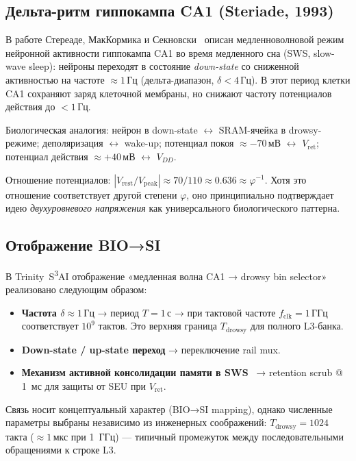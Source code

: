 \subsection{Дельта-ритм гиппокампа CA1 (Steriade, 1993)}

В работе Стереаде, МакКормика и Секновски~\cite{SteriadeCA1Slow1993}
описан медленноволновой режим нейронной активности гиппокампа CA1
во время медленного сна (SWS, slow-wave sleep):
нейроны переходят в состояние \emph{down-state} со сниженной активностью
на частоте $\approx 1\,\text{Гц}$ (дельта-диапазон, $\delta < 4\,\text{Гц}$).
В этот период клетки CA1 сохраняют заряд клеточной мембраны,
но снижают частоту потенциалов действия до $< 1\,\text{Гц}$.

Биологическая аналогия:
нейрон в down-state $\longleftrightarrow$ SRAM-ячейка в drowsy-режиме;
деполяризация $\longleftrightarrow$ wake-up;
потенциал покоя $\approx -70\,\text{мВ}$ $\longleftrightarrow$ $V_\mathrm{ret}$;
потенциал действия $\approx +40\,\text{мВ}$ $\longleftrightarrow$ $V_{DD}$.

Отношение потенциалов:
$|V_\mathrm{rest}/V_\mathrm{peak}| \approx 70/110 \approx 0.636 \approx \varphi^{-1}$.
Хотя это отношение соответствует другой степени $\varphi$,
оно принципиально подтверждает идею \emph{двухуровневого напряжения}
как универсального биологического паттерна.

\subsection{Отображение BIO→SI}

В Trinity~S\textsuperscript{3}AI отображение
«медленная волна CA1 → drowsy bin selector» реализовано следующим образом:
%
\begin{itemize}
  \item \textbf{Частота $\delta \approx 1\,\text{Гц}$}
        → период $T = 1\,\text{с}$
        → при тактовой частоте $f_\mathrm{clk} = 1\,\text{ГГц}$
        соответствует $10^9$ тактов.
        Это верхняя граница $T_\mathrm{drowsy}$ для полного L3-банка.
  \item \textbf{Down-state / up-state переход}
        → переключение rail mux.
  \item \textbf{Механизм активной консолидации памяти в SWS}~\cite{SteriadeCA1Slow1993}
        → retention scrub @ 1~мс для защиты от SEU при $V_\mathrm{ret}$.
\end{itemize}
%
Связь носит концептуальный характер (BIO→SI mapping),
однако численные параметры выбраны независимо
из инженерных соображений: $T_\mathrm{drowsy} = 1024$ такта
($\approx 1\,\text{мкс}$ при 1~ГГц) — типичный промежуток
между последовательными обращениями к строке L3.

